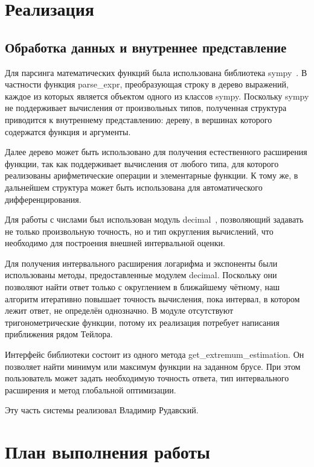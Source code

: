 \documentclass[a4paper,12pt]{extarticle}
\begin{document}
\section*{Реализация}
\subsection*{Обработка данных и внутреннее представление}
Для парсинга математических функций была использована библиотека sympy~\cite{python-sympy}. В частности функция parse\_expr, преобразующая строку в дерево выражений, каждое из которых является объектом одного из классов sympy. Поскольку sympy не поддерживает вычисления от произвольных типов, полученная структура приводится к внутреннему представлению: дереву, в вершинах которого содержатся функция и аргументы.

Далее дерево может быть использовано для получения естественного расширения функции, так как поддерживает вычисления от любого типа, для которого реализованы арифметические операции и элементарные функции. К тому же, в дальнейшем структура может быть использована для автоматического дифференцирования.

Для работы с числами был использован модуль decimal~\cite{python-decimal}, позволяющий задавать не только произвольную точность, но и тип округления вычислений, что необходимо для построения внешней интервальной оценки.

Для получения интервального расширения логарифма и экспоненты были использованы методы, предоставленные модулем decimal. Поскольку они позволяют найти ответ только с округлением в ближайшему чётному, наш алгоритм итеративно повышает точность вычисления, пока интервал, в котором лежит ответ, не определён однозначно. В модуле отсутствуют тригонометрические функции, потому их реализация потребует написания приближения рядом Тейлора.

Интерфейс библиотеки состоит из одного метода get\_extremum\_estimation. Он позволяет найти минимум или максимум функции на заданном брусе. При этом пользователь может задать необходимую точность ответа, тип интервального расширения и метод глобальной оптимизации.

Эту часть системы реализовал Владимир Рудавский.

\section{План выполнения работы}
\end{document}
